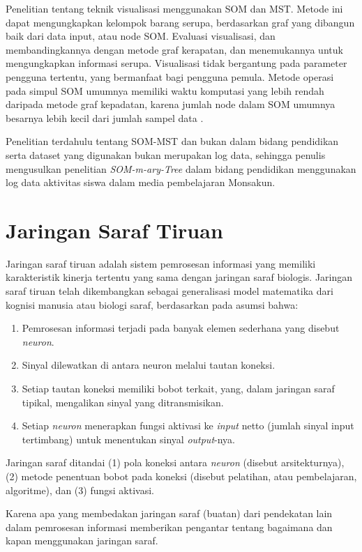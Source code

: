 Penelitian tentang teknik visualisasi menggunakan SOM dan MST. Metode ini dapat mengungkapkan kelompok barang serupa, berdasarkan graf yang dibangun baik dari data input, atau node SOM. Evaluasi visualisasi, dan membandingkannya dengan metode graf kerapatan, dan menemukannya untuk mengungkapkan informasi serupa. Visualisasi tidak bergantung pada parameter pengguna tertentu, yang bermanfaat bagi pengguna pemula. Metode operasi pada simpul SOM umumnya memiliki waktu komputasi yang lebih rendah daripada metode graf kepadatan, karena jumlah node dalam SOM umumnya besarnya lebih kecil dari jumlah sampel data \citep{MayerRauber2010}.

Penelitian terdahulu tentang SOM-MST dan bukan dalam bidang pendidikan serta dataset yang digunakan bukan merupakan log data, sehingga penulis mengusulkan penelitian \textit{ SOM-m-ary-Tree} dalam bidang pendidikan menggunakan log data aktivitas siswa dalam media pembelajaran Monsakun.

\section{Jaringan Saraf Tiruan}

Jaringan saraf tiruan adalah sistem pemrosesan informasi yang memiliki karakteristik kinerja tertentu yang sama dengan jaringan saraf biologis. Jaringan saraf tiruan telah dikembangkan sebagai generalisasi model matematika dari kognisi manusia atau biologi saraf, berdasarkan pada asumsi bahwa:

\begin{enumerate}
	\item Pemrosesan informasi terjadi pada banyak elemen sederhana yang disebut
	\textit{neuron}.
	\item Sinyal dilewatkan di antara neuron melalui tautan koneksi.
	\item Setiap tautan koneksi memiliki bobot terkait, yang, dalam jaringan saraf tipikal, mengalikan sinyal yang ditransmisikan.
	\item Setiap \textit{neuron} menerapkan fungsi aktivasi ke \textit{input} netto (jumlah sinyal input
	tertimbang) untuk menentukan sinyal \textit{output}-nya.
\end{enumerate}

Jaringan saraf ditandai (1) pola koneksi antara \textit{neuron} (disebut arsitekturnya), (2) metode penentuan bobot pada koneksi (disebut pelatihan, atau pembelajaran, algoritme), dan (3) fungsi aktivasi.

Karena apa yang membedakan jaringan saraf (buatan) dari pendekatan lain dalam pemrosesan informasi memberikan pengantar tentang bagaimana dan kapan menggunakan jaringan saraf.

